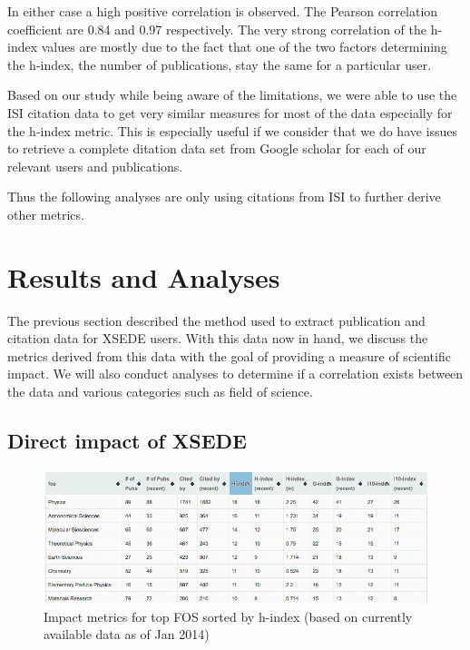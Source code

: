 \documentclass{sig-alternate}
\begin{document}
In either case a high positive correlation is observed. The Pearson correlation coefficient are 0.84 and 0.97 respectively. The very strong correlation of the h-index values are mostly due to the fact that one of the two factors determining the h-index, the number of publications, stay the same for a particular user. 
 
Based on our study while being aware of the limitations, we were able to use the ISI citation data to get very similar measures for most of the data especially for the h-index metric. This is especially useful if we consider that we do have issues to retrieve a complete ditation data set from Google scholar for each of our relevant users and publications.

Thus the following analyses are only using citations from ISI to further derive other metrics. 
 
\section{Results and Analyses} \label{S:result}
 
The previous section described the method used to extract publication and citation data for XSEDE users.  With this data now in hand, we discuss the metrics derived from this data with the goal of providing a measure of scientific impact. We will also conduct analyses to determine if a correlation exists between the data and various categories such as field of science. 
 
\subsection{Direct impact of XSEDE} 
 
\begin{figure}[!htb] 
  \centering 
    \includegraphics[width=2.0\columnwidth]{images/XDPUBS_Metrics_FOS.png} 
  \caption{Impact metrics for top FOS sorted by h-index (based on currently available data as of Jan 2014)}\label{F:xdpubs-metrics-fos} 
\end{figure} 
 
\end{document}
